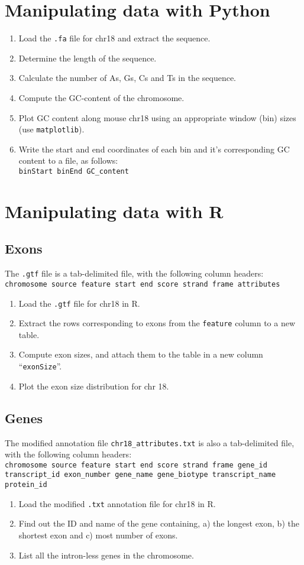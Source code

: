 \documentclass[a4paper,11pt]{article}
\begin{document}
\section{Manipulating data with Python}
\begin{enumerate}
\item Load the \texttt{.fa} file for chr18 and extract the sequence.
\item Determine the length of the sequence.
\item Calculate the number of As, Gs, Cs and Ts in the sequence.
\item Compute the GC-content of the chromosome.
\item Plot GC content along mouse chr18 using an appropriate window (bin) sizes (use \texttt{matplotlib}).
\item Write the start and end coordinates of each bin and it's corresponding GC content to a file, as follows: \\
\texttt {binStart binEnd	GC\_content}
\end{enumerate}



\section{Manipulating data with R}
\subsection{Exons}
The \texttt{.gtf} file is a tab-delimited file, with the following column headers: \\
\texttt {chromosome	source	feature	start	end	score	strand	frame	attributes}
\begin{enumerate}
\item Load the \texttt{.gtf} file for chr18 in R.
\item Extract the rows corresponding to exons from the \texttt{feature} column to a new table.
\item Compute exon sizes, and attach them to the table in a new column ``\texttt{exonSize}''.
\item Plot the exon size distribution for chr 18.
\end{enumerate}
\subsection{Genes}
The modified annotation file \texttt{chr18\_attributes.txt} is also a tab-delimited file, with the \indent following column headers: \\
\texttt {chromosome	source	feature	start	end	score	strand	frame	gene\_id	 transcript\_id 	 exon\_number 	 gene\_name 	 gene\_biotype 	 \indent transcript\_name 	 protein\_id }
\begin{enumerate}
\normalsize
\item Load the modified \texttt{.txt} annotation file for chr18 in R.
\item Find out the ID and name of the gene containing,
 a) the longest exon, b) the shortest exon and c) most number of exons.
\item List all the intron-less genes in the chromosome.
\end{enumerate}
\end{document}
